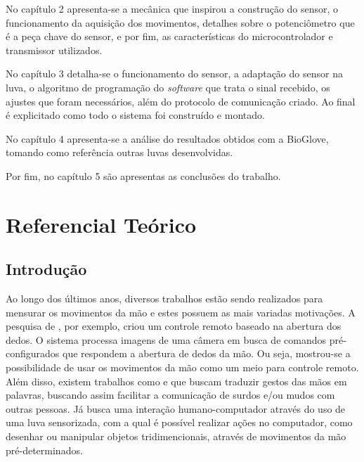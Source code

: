 \documentclass[
	12pt,				%
	openright,			%
	oneside,			%
	a4paper,			%
	english,			%
	brazil				%
	]{abntex2}
\begin{document}
		No capítulo 2 apresenta-se a mecânica que inspirou a construção do sensor, o funcionamento da aquisição dos movimentos, detalhes sobre o potenciômetro que é a peça chave do sensor, e por fim, as características do microcontrolador e transmissor utilizados.
		
		No capítulo 3 detalha-se o funcionamento do sensor, a adaptação do sensor na luva, o algoritmo de programação do \textit{software} que trata o sinal recebido, os ajustes que foram necessários, além do protocolo de comunicação criado. Ao final é explicitado como todo o sistema foi construído e montado.

		No capítulo 4 apresenta-se a análise do resultados obtidos com a BioGlove, tomando como referência outras luvas desenvolvidas.

		Por fim, no capítulo 5 são apresentas as conclusões do trabalho.
		





	
	\chapter{Referencial Teórico}

		\section{Introdução}

		Ao longo dos últimos anos, diversos trabalhos estão sendo realizados para mensurar os movimentos da mão e estes possuem as mais variadas motivações. A pesquisa de \cite{daeholee2009vision}, por exemplo, criou um controle remoto baseado na abertura dos dedos. O sistema processa imagens de uma câmera em busca de comandos pré-configurados que respondem a abertura de dedos da mão. Ou seja, mostrou-se a possibilidade de usar os movimentos da mão como um meio para controle remoto. Além disso, existem trabalhos como \cite{solanki2013sign} e \cite{anbarasi2013deafmute} que buscam traduzir gestos das mãos em palavras, buscando assim facilitar a comunicação de surdos e/ou mudos com outras pessoas. Já \cite{kumar2012hci} busca uma interação humano-computador através do uso de uma luva sensorizada, com a qual é possível realizar ações no computador, como desenhar ou manipular objetos tridimencionais, através de movimentos da mão pré-determinados.
\end{document}
